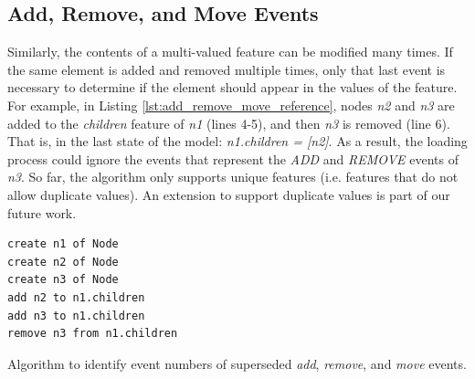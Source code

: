 \documentclass{llncs}
\begin{document}
\subsection{Add, Remove, and Move Events}\label{subsec:add_remove_and_move_operations}
Similarly, the contents of a multi-valued feature can be modified many times.
If the same element is added and removed multiple times,  only that last event is necessary to determine if the element should appear in the values of the feature.
For example, in Listing \ref{lst:add_remove_move_reference},  nodes \emph{n2} and \emph{n3} are added to the \emph{children} feature of \emph{n1} (lines 4-5), and then \emph{n3} is removed (line 6).
That is, in the last state of the model: \emph{n1.children = [n2]}.
As a result, the loading process could ignore the events that represent the \emph{ADD} and \emph{REMOVE} events of \emph{n3}. So far, the algorithm only supports unique features (i.e. features that do not allow duplicate values). An extension to support duplicate values is part of our future work. 

\begin{lstlisting}[style=eol,caption={Example of CBP representation of attribute \emph{values}'s add and remove operations.},label=lst:add_remove_move_reference]
create n1 of Node
create n2 of Node
create n3 of Node
add n2 to n1.children
add n3 to n1.children
remove n3 from n1.children
\end{lstlisting}

\begin{algorithm}[H]
\begin{small}
\end{small}
\caption{Algorithm to identify event numbers of superseded \emph{add}, \emph{remove}, and \emph{move} events.}
\label{alg:add_remove_move_optimisation}
\end{algorithm}
\end{document}

